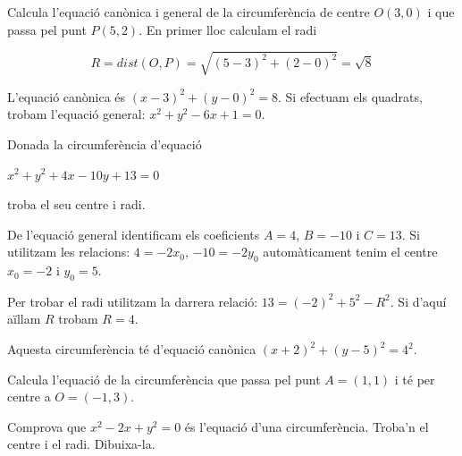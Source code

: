 \begin{resolt}[Exemple]{Calcula l'equació canònica i general de la circumferència de centre $O(3,0)$ i que passa pel punt $P(5,2)$.}
	 En primer lloc calculam el radi 
	 
	 \[R=dist(O, P)=\sqrt{(5-3)^2+(2-0)^2}=\sqrt{8}\]
	 
	 L'equació canònica és $(x-3)^2+(y-0)^2=8$. Si efectuam els quadrats, trobam l'equació general: $x^2+y^2-6x+1=0$. 
\end{resolt}
\pagebreak
\begin{resolt}{Donada la circumferència d'equació 
		
		$x^2+y^2+4x-10y+13=0$ 
		
		troba el seu centre i radi.}
	 De l'equació general identificam els coeficients $A=4$, $B=-10$ i $C=13$. Si utilitzam les relacions:  $4=-2x_0$,  $-10=-2y_0$ automàticament tenim el centre $x_0=-2$ i $y_0=5$. 
	 
	 Per trobar el radi utilitzam la darrera relació: $13=(-2)^2+5^2-R^2$. Si d'aquí aïllam $R$ trobam $R=4$.
	 
	  Aquesta circumferència té d'equació canònica $(x+2)^2+(y-5)^2=4^2$.	
\end{resolt}

\begin{mylist}

	\exer[1]  Calcula l'equació de la circumferència que passa pel punt $A=(1, 1)$ i té per centre a  $O=(-1, 3)$.
	
    \exer[1]  Comprova que $x^{2} -2x+y^{2} =0$ és l'equació d'una circumferència. Troba'n el centre i el radi. Dibuixa-la.
	 
\end{mylist}

